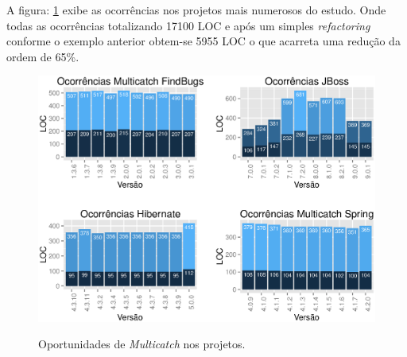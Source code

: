 A figura: \ref{fig:ocorrenciasMulticatchVersoes} exibe as ocorrências nos projetos mais numerosos do estudo. Onde todas as ocorrências totalizando 17100 \acs{LOC} e após um simples \textit{refactoring} conforme o exemplo anterior obtem-se 5955 \acs{LOC} o que acarreta uma redução da ordem de 65\%.\\

\begin{figure}[h]
	\center
	\includegraphics[scale=0.8]{Imagens/ocorrenciasMulticatchVersoes}
	\label{fig:ocorrenciasMulticatchVersoes}
	\caption{Oportunidades de \textit{Multicatch} nos projetos.}
\end{figure}
\clearpage
